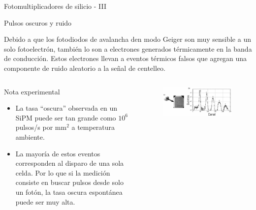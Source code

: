 \documentclass[a4paper,10pt]{beamer}
\begin{document}
\begin{frame}{Fotomultiplicadores de silicio - III}
 
 {\large{\color{blue}Pulsos oscuros y ruido}}
 
 \begin{justify}
  Debido a que los fotodiodos de avalancha den modo Geiger son muy sensible a 
  un solo fotoelectrón, también lo son a electrones generados térmicamente en la 
  banda de conducción. Estos electrones llevan a eventos térmicos falsos que 
  agregan una componente de ruido aleatorio a la señal de centelleo.
 \end{justify}
 
 \begin{columns}[c]
 
 \column{2in}
 \begin{exampleblock}{Nota experimental}
 \small
  \begin{itemize}
   \item \begin{justify}
          La tasa ``oscura'' observada en un SiPM puede ser tan grande como $10^6$
          pulsos/s por mm$^2$ a temperatura ambiente.
         \end{justify}
         \item \begin{justify}
         La mayoría de estos eventos corresponden al disparo de una sola celda. Por 
         lo que si la medición consiste en buscar pulsos desde solo un fotón, la 
         tasa oscura espontánea puede ser muy alta.
         \end{justify}
  \end{itemize}
  
 \end{exampleblock}
 
 \column{2.3in}
  \begin{figure}
   \center
   \includegraphics[scale=0.27]{fig42a}
  \end{figure} 
  
  
  \end{columns}
\end{frame}
\end{document}
